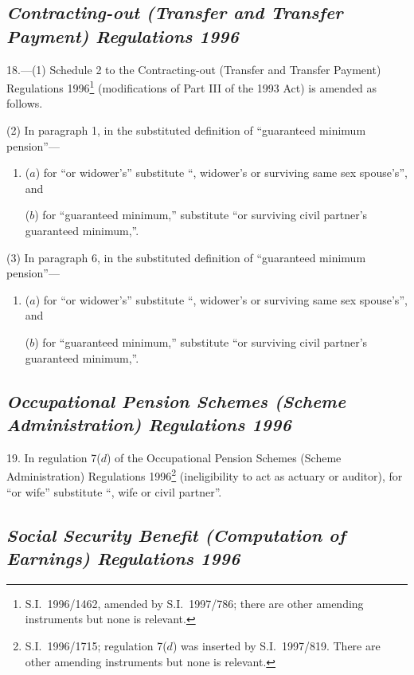 \documentclass[12pt,a4paper]{article}
\begin{document}
\subsection*{\itshape\sloppy{} Contracting-out (Transfer and Transfer Payment) Regulations 1996}

18.—(1) Schedule 2 to the Contracting-out (Transfer and Transfer Payment) Regulations 1996\footnote{S.I.~1996/1462, amended by S.I.~1997/786; there are other amending instruments but none is relevant.} (modifications of Part III of the 1993 Act) is amended as follows.

(2) In paragraph 1, in the substituted definition of “guaranteed minimum pension”—
\begin{enumerate}\item[]
($a$) for “or widower’s” substitute “, widower’s or surviving same sex spouse’s”, and

($b$) for “guaranteed minimum,” substitute “or surviving civil partner’s guaranteed minimum,”.
\end{enumerate}

(3) In paragraph 6, in the substituted definition of “guaranteed minimum pension”—
\begin{enumerate}\item[]
($a$) for “or widower’s” substitute “, widower’s or surviving same sex spouse’s”, and

($b$) for “guaranteed minimum,” substitute “or surviving civil partner’s guaranteed minimum,”.
\end{enumerate}

\subsection*{\itshape Occupational Pension Schemes (Scheme Administration) Regulations 1996}

19.  In regulation 7($d$)  of the Occupational Pension Schemes (Scheme Administration) Regulations 1996\footnote{S.I.~1996/1715; regulation 7($d$)  was inserted by S.I.~1997/819. There are other amending instruments but none is relevant.} (ineligibility to act as actuary or auditor), for “or wife” substitute “, wife or civil partner”.

\subsection*{\itshape\sloppy Social Security Benefit (Computation of Earnings) Regulations 1996}
\end{document}
